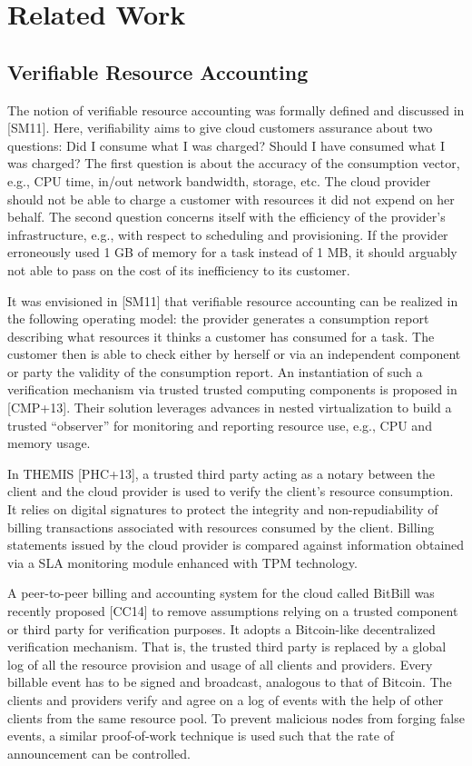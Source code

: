 \section{Related Work} \label{sect:related-work}

\subsection{Verifiable Resource Accounting}

The notion of verifiable resource accounting was formally defined and discussed in [SM11]. Here, verifiability aims to give cloud customers assurance about two questions:
Did I consume what I was charged?
Should I have consumed what I was charged?
The first question is about the accuracy of the consumption vector, e.g., CPU time, in/out network bandwidth, storage, etc. The cloud provider should not be able to charge a customer with resources it did not expend on her behalf. The second question concerns itself with the efficiency of the provider’s infrastructure, e.g., with respect to scheduling and provisioning. If the provider erroneously used 1 GB of memory for a task instead of 1 MB, it should arguably not able to pass on the cost of its inefficiency to its customer.

It was envisioned in [SM11] that verifiable resource accounting can be realized in the following operating model: the provider generates a consumption report describing what resources it thinks a customer has consumed for a task. The customer then is able to check either by herself or via an independent component or party the validity of the consumption report. An instantiation of such a verification mechanism via trusted trusted computing components is proposed in [CMP+13]. Their solution leverages advances in nested virtualization to build a trusted ``observer'' for monitoring and reporting resource use, e.g., CPU and memory usage.

In THEMIS [PHC+13], a trusted third party acting as a notary between the client and the cloud provider is used to verify the client’s resource consumption. It relies on digital signatures to protect the integrity and non-repudiability of billing transactions associated with resources consumed by the client. Billing statements issued by the cloud provider is compared against information obtained via a SLA monitoring module enhanced with TPM technology.

A peer-to-peer billing and accounting system for the cloud called BitBill was recently proposed [CC14] to remove assumptions relying on a trusted component or third party for verification purposes. It adopts a Bitcoin-like decentralized verification mechanism. That is, the trusted third party is replaced by a global log of all the resource provision and usage of all clients and providers. Every billable event has to be signed and broadcast, analogous to that of Bitcoin. The clients and providers verify and agree on a log of events with the help of other clients from the same resource pool. To prevent malicious nodes from forging false events, a similar proof-of-work technique is used such that the rate of announcement can be controlled.


